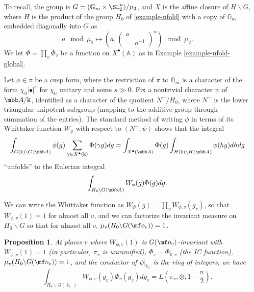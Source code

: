 \documentclass[final]{amsart}
\newtheorem{prop}[subsubsection]{Proposition}
\theoremstyle{remark}
\theoremstyle{definition}
\numberwithin{equation}{section}
\begin{document}
To recall, the group is $G=(\mathbb G_m\times \SL_2^n)/\mu_2$, and $X$ is the affine closure of $H\backslash G$, where $H$ is the product of the group $H_0$ of \eqref{example-nfold} with a copy of $\mathbb G_m$ embedded diagonally into $G$ as 
\begin{equation}\label{Gmembedding} a \mod \mu_2 \mapsto \left( a, \begin{pmatrix} a \\ & a^{-1}\end{pmatrix}^n \right ) \mod \mu_2.
\end{equation}
We let $\Phi = \prod_v \Phi_v$ be a function on $X^\bullet(\mathbb A)$ as in Example \ref{example-nfold-global}.

Let $\phi\in \pi$ be a cusp form, where the restriction of $\pi$ to $\mathbb G_m$ is a character of the form $\chi_0 |\bullet|^s$ for $\chi_0$ unitary and some $s \gg 0$. Fix a nontrivial character $\psi$ of $\mbb A/\Bbbk$, identified as a character of the quotient $N^-/H_0$, where $N^-$ is the lower triangular unipotent subgroup (mapping to the additive group through summation of the entries). The standard method of writing $\phi$ in terms of its Whittaker function $W_\phi$ with respect to $(N^-,\psi)$ shows that the integral   
\[ \int_{G(\Bbbk)\backslash G(\mbb A)} \phi(g) \sum_{\gamma\in X^\bullet(\Bbbk)} \Phi(\gamma g) dg = \int_{X^\bullet(\mbb A)} \Phi(g) \int_{H(\Bbbk)\backslash H(\mbb A)} \phi(hg) dh dg\]
``unfolds'' to the Eulerian integral
 \[ \int_{H_0\backslash G (\mbb A)} W_\phi(g) \Phi(g) dg.\]
 
We can write the Whittaker function as $W_\Phi(g) = \prod_v W_{\phi, v}(g_v)$, so that $W_{\phi,v}(1) = 1$ for almost all $v$, and we can factorize the invariant measure on $H_0\backslash G$ so that for almost all $v$, $\mu_v(H_0\backslash G(\mf o_v)) = 1$. 

\begin{prop}\label{prop:localzeta}
At places $v$ where $W_{\phi,v}(1)$ is $G(\mf o_v)$-invariant with $W_{\phi,v}(1) = 1$ (in particular, $\pi_v$ is unramified), $\Phi_v=\Phi_{0,v}$ (the IC function), $\mu_v(H_0\backslash G(\mf o_v)) = 1$, and the conductor of $\psi|_{\Bbbk_v}$ is the ring of integers, we have
\begin{equation}\label{eq:localzetafactor}
   \int_{H_0\backslash G (\Bbbk_v)} W_{\phi,v}(g_v) \Phi_v(g_v) dg_v = L(\pi_v, \otimes, 1 - \frac{n}{2}).
\end{equation}
\end{prop}
\end{document}

